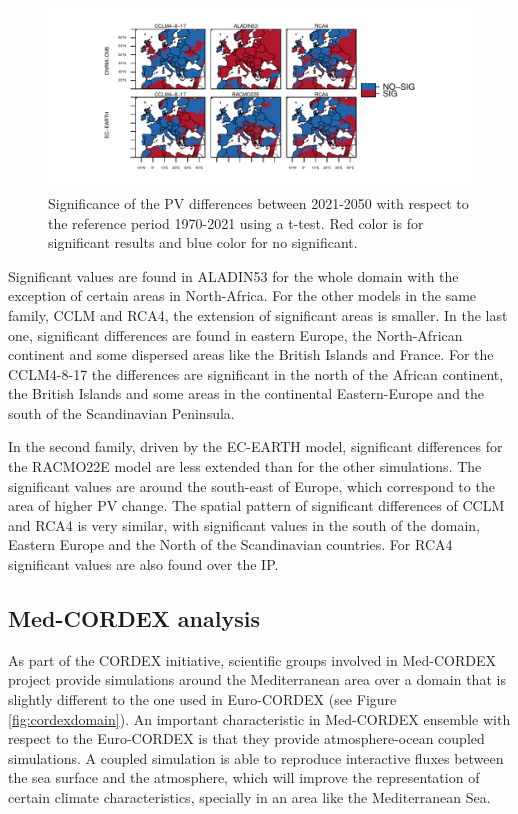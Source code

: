 \begin{figure}[h]
    \includegraphics[width=1\textwidth]{figs/capitulo7/pvalor_prueba.pdf}
    \caption[Statistical significance of PV changes]{Significance of the PV differences between 2021-2050 with respect to the reference period 1970-2021 using a t-test. Red color is for significant results and blue color for no significant.}
\label{fig:pvalor}
\end{figure}

Significant values are found in ALADIN53 for the whole domain with the exception of certain areas in North-Africa. For the other models in the same family, CCLM and RCA4, the extension of significant areas is smaller. In the last one, significant differences are found in eastern Europe, the North-African continent and some dispersed areas like the British Islands and France. For the CCLM4-8-17 the differences are significant in the north of the African continent, the British Islands and some areas in the continental Eastern-Europe and the south of the Scandinavian Peninsula.

In the second family, driven by the EC-EARTH model, significant differences for the RACMO22E model are less extended than for the other simulations. The significant values are around the south-east of Europe, which correspond to the area of higher PV change. The spatial pattern of significant differences of CCLM and RCA4 is very similar, with significant values in the south of the domain, Eastern Europe and the North of the Scandinavian countries. For RCA4 significant values are also found over the IP. 

\subsection*{Med-CORDEX analysis}

As part of the CORDEX initiative, scientific groups involved in Med-CORDEX \cite*{Ruti2016} project provide simulations around the Mediterranean area over a domain that is slightly different to the one used in Euro-CORDEX (see Figure \ref{fig:cordexdomain}). An important characteristic in Med-CORDEX ensemble with respect to the Euro-CORDEX is that they provide atmosphere-ocean coupled simulations. A coupled simulation is able to reproduce interactive fluxes between the sea surface and the atmosphere, which will improve the representation of certain climate characteristics, specially in an area like the Mediterranean Sea.

